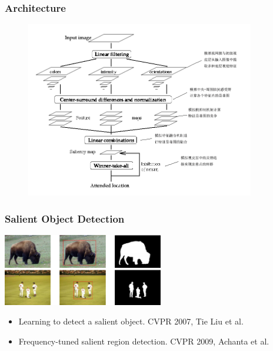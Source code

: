 \documentclass[notheorems,serif,table,compress]{beamer}  %
\begin{document}
\begin{frame}
\frametitle{Architecture}
\begin{figure}
\includegraphics[width=10cm]{ITTImodel.png}
\end{figure}
\end{frame}

%




\begin{frame}
\frametitle{Salient Object Detection}
\centering\includegraphics[width=7cm]{FT.png}
\begin{itemize}
\item Learning to detect a salient object. CVPR 2007, Tie Liu et al.
\item Frequency-tuned salient region detection. CVPR 2009, Achanta et al.
\end{itemize}
\end{frame}


\end{document}

